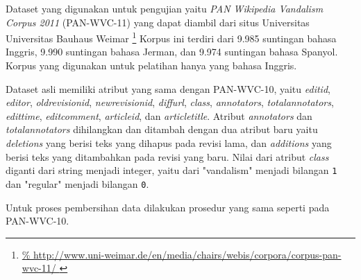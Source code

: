 Dataset yang digunakan untuk pengujian yaitu \textit{PAN Wikipedia Vandalism
Corpus 2011} (PAN-WVC-11)
\parencite{potthast:2010b}
yang dapat diambil dari situs Universitas Universitas Bauhaus Weimar
\footnote{%
	\RaggedRight\url{%
http://www.uni-weimar.de/en/media/chairs/webis/corpora/corpus-pan-wvc-11/
	}
}
Korpus ini terdiri dari 9.985 suntingan bahasa Inggris, 9.990 suntingan bahasa
Jerman, dan 9.974 suntingan bahasa Spanyol.
Korpus yang digunakan untuk pelatihan hanya yang bahasa Inggris.

Dataset asli memiliki atribut yang sama dengan PAN-WVC-10, yaitu
\textit{editid},
\textit{editor},
\textit{oldrevisionid},
\textit{newrevisionid},
\textit{diffurl},
\textit{class},
\textit{annotators},
\textit{totalannotators},
\textit{edittime},
\textit{editcomment},
\textit{articleid}, dan
\textit{articletitle}.
Atribut \textit{annotators} dan \textit{totalannotators} dihilangkan dan
ditambah dengan dua atribut baru yaitu \textit{deletions} yang berisi teks yang
dihapus pada revisi lama, dan \textit{additions} yang berisi teks yang
ditambahkan pada revisi yang baru.
Nilai dari atribut \textit{class} diganti dari string menjadi integer, yaitu
dari "vandalism" menjadi bilangan \texttt{1}
dan "regular" menjadi bilangan \texttt{0}.

Untuk proses pembersihan data dilakukan prosedur yang sama seperti pada
PAN-WVC-10.
